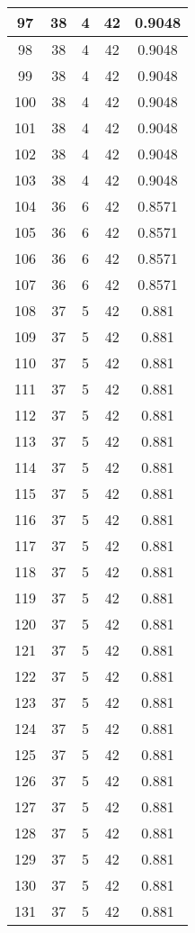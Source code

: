 \documentclass[letterpaper, 12pt]{article}
\begin{document}
\begin{longtable}{|c|c|c|c|c|}
\hline
97 & 38 & 4 & 42 & 0.9048 \\
\hline
98 & 38 & 4 & 42 & 0.9048 \\
\hline
99 & 38 & 4 & 42 & 0.9048 \\
\hline
100 & 38 & 4 & 42 & 0.9048 \\
\hline
101 & 38 & 4 & 42 & 0.9048 \\
\hline
102 & 38 & 4 & 42 & 0.9048 \\
\hline
103 & 38 & 4 & 42 & 0.9048 \\
\hline
104 & 36 & 6 & 42 & 0.8571 \\
\hline
105 & 36 & 6 & 42 & 0.8571 \\
\hline
106 & 36 & 6 & 42 & 0.8571 \\
\hline
107 & 36 & 6 & 42 & 0.8571 \\
\hline
108 & 37 & 5 & 42 & 0.881 \\
\hline
109 & 37 & 5 & 42 & 0.881 \\
\hline
110 & 37 & 5 & 42 & 0.881 \\
\hline
111 & 37 & 5 & 42 & 0.881 \\
\hline
112 & 37 & 5 & 42 & 0.881 \\
\hline
113 & 37 & 5 & 42 & 0.881 \\
\hline
114 & 37 & 5 & 42 & 0.881 \\
\hline
115 & 37 & 5 & 42 & 0.881 \\
\hline
116 & 37 & 5 & 42 & 0.881 \\
\hline
117 & 37 & 5 & 42 & 0.881 \\
\hline
118 & 37 & 5 & 42 & 0.881 \\
\hline
119 & 37 & 5 & 42 & 0.881 \\
\hline
120 & 37 & 5 & 42 & 0.881 \\
\hline
121 & 37 & 5 & 42 & 0.881 \\
\hline
122 & 37 & 5 & 42 & 0.881 \\
\hline
123 & 37 & 5 & 42 & 0.881 \\
\hline
124 & 37 & 5 & 42 & 0.881 \\
\hline
125 & 37 & 5 & 42 & 0.881 \\
\hline
126 & 37 & 5 & 42 & 0.881 \\
\hline
127 & 37 & 5 & 42 & 0.881 \\
\hline
128 & 37 & 5 & 42 & 0.881 \\
\hline
129 & 37 & 5 & 42 & 0.881 \\
\hline
130 & 37 & 5 & 42 & 0.881 \\
\hline
131 & 37 & 5 & 42 & 0.881 \\

\end{longtable}
\end{document}
